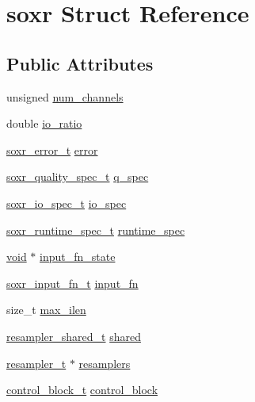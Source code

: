 \hypertarget{structsoxr}{}\section{soxr Struct Reference}
\label{structsoxr}
\subsection*{Public Attributes}
\begin{DoxyCompactItemize}
\item 
unsigned \hyperlink{structsoxr_a778913150a0ebcbe2f8f918bea261b1f}{num\+\_\+channels}
\item 
double \hyperlink{structsoxr_a285e9db9b8b56e49f5899acc810ada80}{io\+\_\+ratio}
\item 
\hyperlink{soxr_8h_a9c0f6f8249a04c1ccb71881e2b0b6937}{soxr\+\_\+error\+\_\+t} \hyperlink{structsoxr_a67c1c91e4377ab564c67acde95822038}{error}
\item 
\hyperlink{soxr_8h_afe5d91d1e46d7d7f9aff9a87f62e6665}{soxr\+\_\+quality\+\_\+spec\+\_\+t} \hyperlink{structsoxr_ad86308d2e768fb9f67ec488772e73d5c}{q\+\_\+spec}
\item 
\hyperlink{soxr_8h_a9a3982afc7db355cc4b40b4ff31ffb30}{soxr\+\_\+io\+\_\+spec\+\_\+t} \hyperlink{structsoxr_a77198536bdb21d6f27b96d404753ba14}{io\+\_\+spec}
\item 
\hyperlink{soxr_8h_afcbbf76969491ce9a1f5e26f2ae54231}{soxr\+\_\+runtime\+\_\+spec\+\_\+t} \hyperlink{structsoxr_a2ba74dd0f08cbb5fa88fdef8abcf0ad6}{runtime\+\_\+spec}
\item 
\hyperlink{sound_8c_ae35f5844602719cf66324f4de2a658b3}{void} $\ast$ \hyperlink{structsoxr_af9c48aab4c71a7e277f4ec3c3a9d5f2c}{input\+\_\+fn\+\_\+state}
\item 
\hyperlink{soxr_8h_a75de274660354270e1e92a4b66a6e915}{soxr\+\_\+input\+\_\+fn\+\_\+t} \hyperlink{structsoxr_a8c0b5ebae0139a0e5ed5b4f95a355cb6}{input\+\_\+fn}
\item 
size\+\_\+t \hyperlink{structsoxr_aef67b4a20e64992d21b55411ac82863f}{max\+\_\+ilen}
\item 
\hyperlink{soxr_8c_a0a9be7db2b8063b74a6ef2366ccccbdb}{resampler\+\_\+shared\+\_\+t} \hyperlink{structsoxr_a7a11d730c8daa76d2367fd94b2384bf9}{shared}
\item 
\hyperlink{soxr_8c_a335a7d30bcecb11f27d6406c643ee21e}{resampler\+\_\+t} $\ast$ \hyperlink{structsoxr_a0a7572ca0ce1d351fdf4c2a72ec48657}{resamplers}
\item 
\hyperlink{soxr_8c_a6346f09fcfe44916a78c94321ed37c5d}{control\+\_\+block\+\_\+t} \hyperlink{structsoxr_a89d093b499c528f01c5e53f282d68310}{control\+\_\+block}

\end{DoxyCompactItemize}
